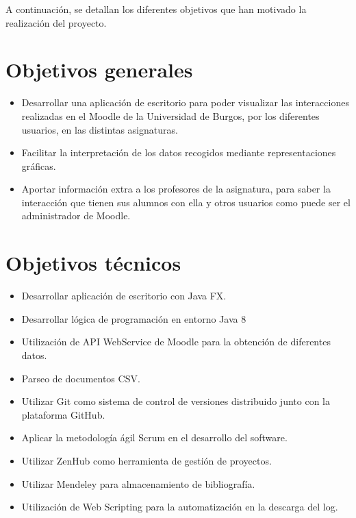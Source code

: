 

A continuación, se detallan los diferentes objetivos que han motivado la
realización del proyecto.

\section{Objetivos generales}\label{objetivos-generales}

\begin{itemize}
	\tightlist
	\item
	Desarrollar una aplicación de escritorio para poder visualizar las interacciones realizadas en el Moodle de la Universidad de Burgos, por los diferentes usuarios, en las distintas asignaturas.
	\item
	Facilitar la interpretación de los datos recogidos mediante
	representaciones gráficas.
	\item
	Aportar información extra a los profesores de la asignatura, para saber la interacción que tienen sus alumnos con ella y otros usuarios como puede ser el administrador de Moodle.
	
\end{itemize}

\section{Objetivos técnicos}\label{objetivos-tecnicos}

\begin{itemize}
	\tightlist
	\item
	Desarrollar aplicación de escritorio con Java FX.
	\item
	Desarrollar lógica de programación en entorno Java 8
	\item
	Utilización de API WebService de Moodle para la obtención de diferentes datos.
	\item
	Parseo de documentos CSV.
	\item
	Utilizar Git como sistema de control de versiones distribuido junto
	con la plataforma GitHub.
	\item
	Aplicar la metodología ágil Scrum en el desarrollo del software.
	\item
	Utilizar ZenHub como herramienta de gestión de proyectos.
	\item
	Utilizar Mendeley para almacenamiento de bibliografía.
	\item
	Utilización de Web Scripting para la automatización en la descarga del log.
\end{itemize}

